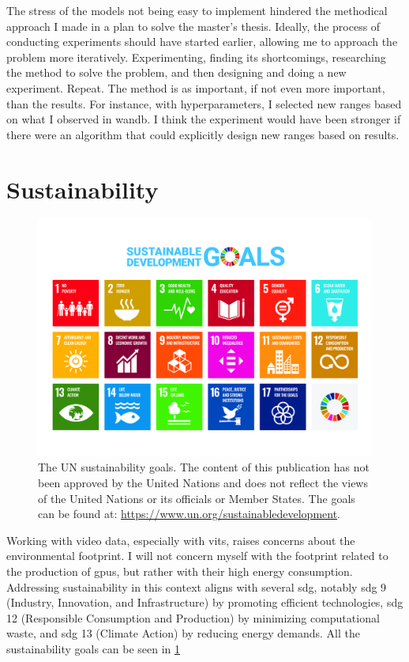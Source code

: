 The stress of the models not being easy to implement hindered the methodical approach I made in a plan to solve the master's thesis. Ideally, the process of conducting experiments should have started earlier, allowing me to approach the problem more iteratively. Experimenting, finding its shortcomings, researching the method to solve the problem, and then designing and doing a new experiment. Repeat. The method is as important, if not even more important, than the results. For instance, with hyperparameters, I selected new ranges based on what I observed in \acrfull{wandb}. I think the experiment would have been stronger if there were an algorithm that could explicitly design new ranges based on results.

\section{Sustainability}

\begin{figure}
    \centering
    \includegraphics[width=1\linewidth]{figures/un_poster.jpg}
    \caption{The UN sustainability goals. The content of this publication has not been approved by the United Nations and does not reflect the views of the United Nations or its officials or Member States. The goals can be found at: \url{https://www.un.org/sustainabledevelopment}.}
    \label{fig:sdg}
\end{figure}

Working with video data, especially with \acrshort{vit}s, raises concerns about the environmental footprint. I will not concern myself with the footprint related to the production of \acrshort{gpu}s, but rather with their high energy consumption. Addressing sustainability in this context aligns with several \acrfull{sdg}, notably \acrshort{sdg} 9 (Industry, Innovation, and Infrastructure) by promoting efficient technologies, \acrshort{sdg} 12 (Responsible Consumption and Production) by minimizing computational waste, and \acrshort{sdg} 13 (Climate Action) by reducing energy demands. All the sustainability goals can be seen in \cref{fig:sdg}

